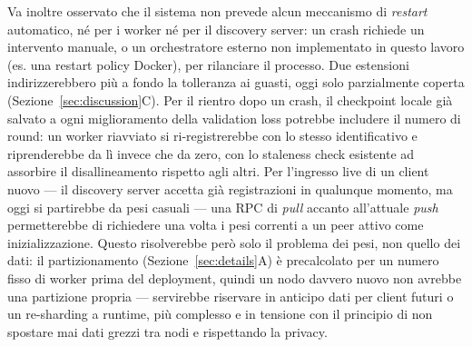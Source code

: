 Va inoltre osservato che il sistema non prevede alcun meccanismo di
\emph{restart} automatico, né per i worker né per il discovery server: un
crash richiede un intervento manuale, o un orchestratore esterno non
implementato in questo lavoro (es. una restart policy Docker), per
rilanciare il processo. Due estensioni indirizzerebbero più a fondo la
tolleranza ai guasti, oggi solo parzialmente coperta
(Sezione~\ref{sec:discussion}C). Per il rientro dopo un crash, il checkpoint
locale già salvato a ogni miglioramento della
validation loss potrebbe includere il numero di round: un worker riavviato
si ri-registrerebbe con lo stesso identificativo e riprenderebbe da lì
invece che da zero, con lo staleness check esistente ad assorbire il
disallineamento rispetto agli altri. Per l'ingresso live di un client nuovo
— il discovery server accetta già registrazioni in qualunque momento, ma
oggi si partirebbe da pesi casuali — una RPC di \emph{pull} accanto
all'attuale \emph{push} permetterebbe di richiedere una volta i pesi
correnti a un peer attivo come inizializzazione. Questo risolverebbe però
solo il problema dei pesi, non quello dei dati: il partizionamento
(Sezione~\ref{sec:details}A) è precalcolato per un numero fisso di worker
prima del deployment, quindi un nodo davvero nuovo non avrebbe una
partizione propria — servirebbe riservare in anticipo dati per client
futuri o un re-sharding a runtime, più complesso e in
tensione con il principio di non spostare mai dati grezzi tra nodi e rispettando la privacy.
